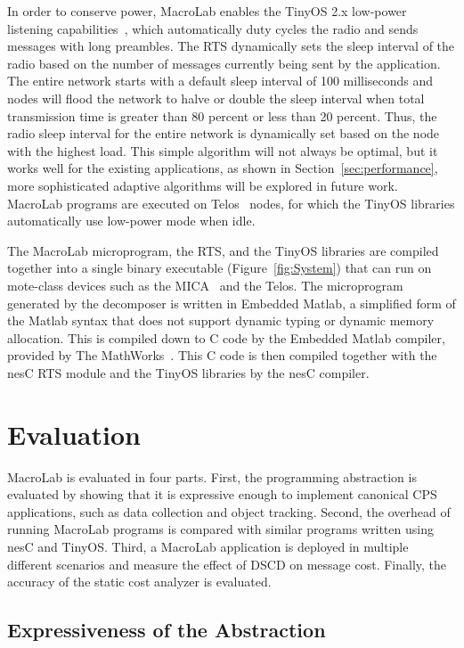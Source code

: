 In order to conserve power, MacroLab enables the TinyOS 2.x low-power listening
capabilities~\cite{Polastrea}, which automatically duty cycles the radio and
sends messages with long preambles.  The RTS dynamically sets the sleep interval
of the radio based on the number of messages currently being sent by the
application.  The entire network starts with a default sleep interval of 100
milliseconds and nodes will flood the network to halve or double the sleep
interval when total transmission time is greater than 80 percent or less than 20
percent.  Thus, the radio sleep interval for the entire network is dynamically
set based on the node with the highest load.  This simple algorithm will not
always be optimal, but it works well for the existing applications, as shown in
Section~\ref{sec:performance}, more sophisticated adaptive algorithms will be
explored in future work.  MacroLab programs are executed on
Telos~\cite{Polastre} nodes, for which the TinyOS libraries automatically use
low-power mode when idle.

The MacroLab microprogram, the RTS, and the TinyOS libraries are compiled
together into a single binary executable (Figure~\ref{fig:System}) that can run
on mote-class devices such as the MICA~\cite{Crossbow} and the Telos.  The
microprogram generated by the decomposer is written in Embedded Matlab, a
simplified form of the Matlab syntax that does not support dynamic typing or
dynamic memory allocation.  This is compiled down to C code by the Embedded
Matlab compiler, provided by The MathWorks~\cite{mathworks}.  This C code is
then compiled together with the nesC RTS module and the TinyOS libraries by the
nesC compiler.

\section{Evaluation} \label{sect:evaluation}

MacroLab is evaluated in four parts. First, the programming abstraction is
evaluated by showing that it is expressive enough to implement canonical CPS
applications, such as data collection and object tracking. Second, the overhead
of running MacroLab programs is compared with similar programs written using
nesC and TinyOS. Third, a MacroLab application is deployed in multiple different
scenarios and measure the effect of DSCD on message cost. Finally, the accuracy
of the static cost analyzer is evaluated.

\subsection{Expressiveness of the Abstraction}\label{sect:expressiveness}


